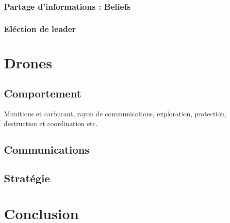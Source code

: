 \documentclass[11pt, letterpaper]{article}
\begin{document}
\subsubsection{Partage d'informations : Beliefs}

\subsubsection{Eléction de leader}

\section{Drones}

\subsection{Comportement}

Munitions et carburant, rayon de communications, exploration, protection, destruction et coordination etc.

\subsection{Communications}

\subsection{Stratégie}

\section*{Conclusion}
\end{document}
